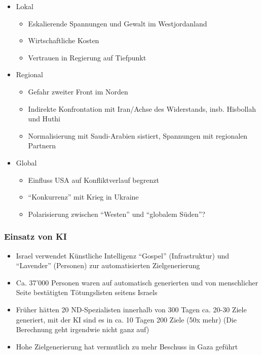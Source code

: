{}\documentclass[a4paper]{article}
\providecommand{\tightlist}{\setlength{\itemsep}{1mm}\setlength{\parskip}{1mm}}
\begin{document}
\begin{itemize}
	\tightlist
	\item
	      Lokal

	      \begin{itemize}
		      \tightlist
		      \item
		            Eskalierende Spannungen und Gewalt im Westjordanland
		      \item
		            Wirtschaftliche Kosten
		      \item
		            Vertrauen in Regierung auf Tiefpunkt
	      \end{itemize}
	\item
	      Regional

	      \begin{itemize}
		      \tightlist
		      \item
		            Gefahr zweiter Front im Norden
		      \item
		            Indirekte Konfrontation mit Iran/Achse des Widerstands, insb.
		            Hisbollah und Huthi
		      \item
		            Normalisierung mit Saudi-Arabien sistiert, Spannungen mit regionalen
		            Partnern
	      \end{itemize}
	\item
	      Global

	      \begin{itemize}
		      \tightlist
		      \item
		            Einfluss USA auf Konfliktverlauf begrenzt
		      \item
		            ``Konkurrenz'' mit Krieg in Ukraine
		      \item
		            Polarisierung zwischen ``Westen'' und ``globalem Süden''?
	      \end{itemize}
\end{itemize}

\subsubsection{Einsatz von KI}\label{einsatz-von-ki}

\begin{itemize}
	\tightlist
	\item
	      Israel verwendet Künstliche Intelligenz ``Gospel'' (Infrastruktur) und
	      ``Lavender'' (Personen) zur automatisierten Zielgenerierung
	\item
	      Ca. 37'000 Personen waren auf automatisch generierten und von
	      menschlicher Seite bestätigten Tötungslisten seitens Israels
	\item
	      Früher hätten 20 ND-Spezialisten innerhalb von 300 Tagen ca. 20-30
	      Ziele generiert, mit der KI sind es in ca. 10 Tagen 200 Ziele (50x
	      mehr) (Die Berechnung geht irgendwie nicht ganz auf)
	\item
	      Hohe Zielgenerierung hat vermutlich zu mehr Beschuss in Gaza geführt
\end{itemize}
\end{document}
